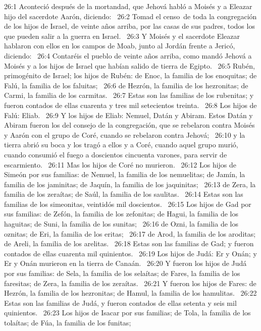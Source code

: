 26:1 Aconteció después de la mortandad, que Jehová habló a Moisés y a Eleazar hijo del sacerdote Aarón, diciendo:  
26:2 Tomad el censo de toda la congregación de los hijos de Israel, de veinte años arriba, por las casas de sus padres, todos los que pueden salir a la guerra en Israel.  
26:3 Y Moisés y el sacerdote Eleazar hablaron con ellos en los campos de Moab, junto al Jordán frente a Jericó, diciendo:  
26:4 Contaréis el pueblo de veinte años arriba, como mandó Jehová a Moisés y a los hijos de Israel que habían salido de tierra de Egipto.  
26:5 Rubén, primogénito de Israel; los hijos de Rubén: de Enoc, la familia de los enoquitas; de Falú, la familia de los faluitas;  
26:6 de Hezrón, la familia de los hezronitas; de Carmi, la familia de los carmitas.  
26:7 Estas son las familias de los rubenitas; y fueron contados de ellas cuarenta y tres mil setecientos treinta.  
26:8 Los hijos de Falú: Eliab.  
26:9 Y los hijos de Eliab: Nemuel, Datán y Abiram. Estos Datán y Abiram fueron los del consejo de la congregación, que se rebelaron contra Moisés y Aarón con el grupo de Coré, cuando se rebelaron contra Jehová;  
26:10 y la tierra abrió su boca y los tragó a ellos y a Coré, cuando aquel grupo murió, cuando consumió el fuego a doscientos cincuenta varones, para servir de escarmiento.  
26:11 Mas los hijos de Coré no murieron.  
26:12 Los hijos de Simeón por sus familias: de Nemuel, la familia de los nemuelitas; de Jamín, la familia de los jaminitas; de Jaquín, la familia de los jaquinitas;  
26:13 de Zera, la familia de los zeraítas; de Saúl, la familia de los saulitas.  
26:14 Estas son las familias de los simeonitas, veintidós mil doscientos.  
26:15 Los hijos de Gad por sus familias: de Zefón, la familia de los zefonitas; de Hagui, la familia de los haguitas; de Suni, la familia de los sunitas;  
26:16 de Ozni, la familia de los oznitas; de Eri, la familia de los eritas;  
26:17 de Arod, la familia de los aroditas; de Areli, la familia de los arelitas.  
26:18 Estas son las familias de Gad; y fueron contados de ellas cuarenta mil quinientos.  
26:19 Los hijos de Judá: Er y Onán; y Er y Onán murieron en la tierra de Canaán.  
26:20 Y fueron los hijos de Judá por sus familias: de Sela, la familia de los selaítas; de Fares, la familia de los faresitas; de Zera, la familia de los zeraítas.  
26:21 Y fueron los hijos de Fares: de Hezrón, la familia de los hezronitas; de Hamul, la familia de los hamulitas.  
26:22 Estas son las familias de Judá, y fueron contados de ellas setenta y seis mil quinientos.  
26:23 Los hijos de Isacar por sus familias; de Tola, la familia de los tolaítas; de Fúa, la familia de los funitas;  

